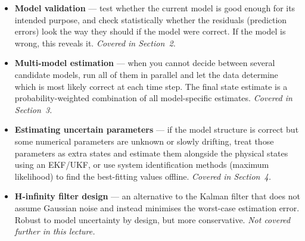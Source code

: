 \documentclass[12pt, a4paper]{article}
\begin{document}
\begin{itemize}[leftmargin=1.5em, itemsep=5pt]

  \item \textbf{Model validation} --- test whether the current model is
    good enough for its intended purpose, and check statistically whether
    the residuals (prediction errors) look the way they should if the model
    were correct.
    If the model is wrong, this reveals it.
    \emph{Covered in Section~2.}

  \item \textbf{Multi-model estimation} --- when you cannot decide between
    several candidate models, run all of them in parallel and let the data
    determine which is most likely correct at each time step.
    The final state estimate is a probability-weighted combination of all
    model-specific estimates.
    \emph{Covered in Section~3.}

  \item \textbf{Estimating uncertain parameters} --- if the model structure
    is correct but some numerical parameters are unknown or slowly drifting,
    treat those parameters as extra states and estimate them alongside the
    physical states using an EKF/UKF, or use system identification methods
    (maximum likelihood) to find the best-fitting values offline.
    \emph{Covered in Section~4.}

  \item \textbf{H-infinity filter design} --- an alternative to the Kalman
    filter that does not assume Gaussian noise and instead minimises the
    worst-case estimation error.
    Robust to model uncertainty by design, but more conservative.
    \emph{Not covered further in this lecture.}

\end{itemize}
\end{document}
